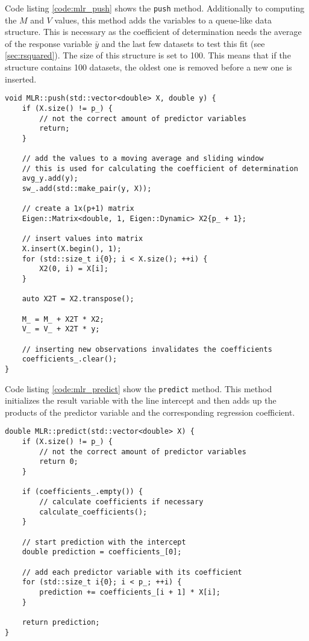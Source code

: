 Code listing \vref{code:mlr_push} shows the \lstinline{push} method. Additionally to computing the $ M $ and $ V $ values, this method adds the variables to a queue-like data structure. This is necessary as the coefficient of determination needs the average of the response variable $ \bar{y} $ and the last few datasets to test this fit (see \vref{sec:rsquared}). The size of this structure is set to 100. This means that if the structure contains 100 datasets, the oldest one is removed before a new one is inserted.

\begin{minipage}{\textwidth}
\begin{lstlisting}[caption={C++ method to add new observations to the regression model},captionpos=b,label={code:mlr_push}]
void MLR::push(std::vector<double> X, double y) {
    if (X.size() != p_) {
        // not the correct amount of predictor variables
        return;
    }

    // add the values to a moving average and sliding window
    // this is used for calculating the coefficient of determination
    avg_y.add(y);
    sw_.add(std::make_pair(y, X));

    // create a 1x(p+1) matrix
    Eigen::Matrix<double, 1, Eigen::Dynamic> X2{p_ + 1};

    // insert values into matrix
    X.insert(X.begin(), 1);
    for (std::size_t i{0}; i < X.size(); ++i) {
        X2(0, i) = X[i];
    }

    auto X2T = X2.transpose();

    M_ = M_ + X2T * X2;
    V_ = V_ + X2T * y;

    // inserting new observations invalidates the coefficients
    coefficients_.clear();
}
\end{lstlisting}
\end{minipage}

Code listing \vref{code:mlr_predict} show the \lstinline{predict} method. This method initializes the result variable with the line intercept and then adds up the products of the predictor variable and the corresponding regression coefficient.

\begin{minipage}{\textwidth}
\begin{lstlisting}[caption={C++ method to predict the response variable using the passed predictor variables},captionpos=b,label={code:mlr_predict}]
double MLR::predict(std::vector<double> X) {
    if (X.size() != p_) {
        // not the correct amount of predictor variables
        return 0;
    }

    if (coefficients_.empty()) {
        // calculate coefficients if necessary
        calculate_coefficients();
    }

    // start prediction with the intercept
    double prediction = coefficients_[0];

    // add each predictor variable with its coefficient
    for (std::size_t i{0}; i < p_; ++i) {
        prediction += coefficients_[i + 1] * X[i];
    }

    return prediction;
}
\end{lstlisting}
\end{minipage}

